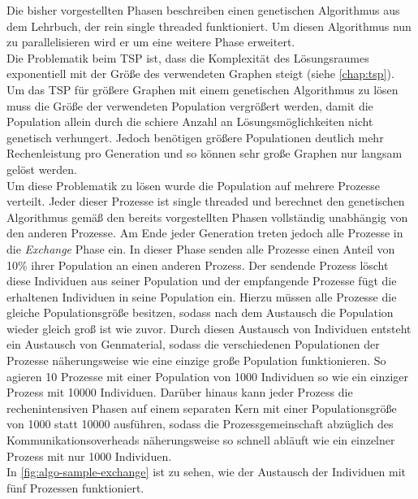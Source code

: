 \documentclass[12pt,a4paper]{scrreprt}
\begin{document}
Die bisher vorgestellten Phasen beschreiben einen genetischen Algorithmus aus dem Lehrbuch, der rein single threaded funktioniert. Um diesen Algorithmus nun zu parallelisieren wird er um eine weitere Phase erweitert.\\
Die Problematik beim TSP ist, dass die Komplexität des Lösungsraumes exponentiell mit der Größe des verwendeten Graphen steigt (siehe \autoref{chap:tsp}). Um das TSP für größere Graphen mit einem genetischen Algorithmus zu lösen muss die Größe der verwendeten Population vergrößert werden, damit die Population allein durch die schiere Anzahl an Lösungsmöglichkeiten nicht genetisch verhungert. Jedoch benötigen größere Populationen deutlich mehr Rechenleistung pro Generation und so können sehr große Graphen nur langsam gelöst werden.\\
Um diese Problematik zu lösen wurde die Population auf mehrere Prozesse verteilt. Jeder dieser Prozesse ist single threaded und berechnet den genetischen Algorithmus gemäß den bereits vorgestellten Phasen vollständig unabhängig von den anderen Prozesse. Am Ende jeder Generation treten jedoch alle Prozesse in die \textit{Exchange} Phase ein. In dieser Phase senden alle Prozesse einen Anteil von 10\% ihrer Population an einen anderen Prozess. Der sendende Prozess löscht diese Individuen aus seiner Population und der empfangende Prozesse fügt die erhaltenen Individuen in seine Population ein. Hierzu müssen alle Prozesse die gleiche Populationsgröße besitzen, sodass nach dem Austausch die Population wieder gleich groß ist wie zuvor. Durch diesen Austausch von Individuen entsteht ein Austausch von Genmaterial, sodass die verschiedenen Populationen der Prozesse näherungsweise wie eine einzige große Population funktionieren. So agieren 10 Prozesse mit einer Population von 1000 Individuen so wie ein einziger Prozess mit 10000 Individuen. Darüber hinaus kann jeder Prozess die rechenintensiven Phasen auf einem separaten Kern mit einer Populationsgröße von 1000 statt 10000 ausführen, sodass die Prozessgemeinschaft abzüglich des Kommunikationsoverheads näherungsweise so schnell abläuft wie ein einzelner Prozess mit nur 1000 Individuen.\\
In \autoref{fig:algo-sample-exchange} ist zu sehen, wie der Austausch der Individuen mit fünf Prozessen funktioniert.
\end{document}
